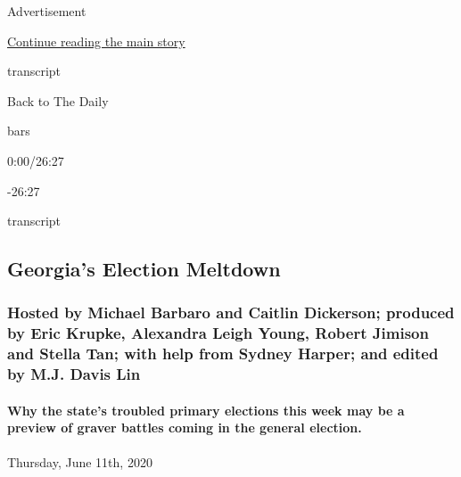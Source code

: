Advertisement

\protect\hyperlink{after-top}{Continue reading the main story}

transcript

Back to The Daily

bars

0:00/26:27

-26:27

transcript

\hypertarget{georgias-election-meltdown}{%
\subsection{Georgia's Election
Meltdown}\label{georgias-election-meltdown}}

\hypertarget{hosted-by-michael-barbaro-and-caitlin-dickerson-produced-by-eric-krupke-alexandra-leigh-young-robert-jimison-and-stella-tan-with-help-from-sydney-harper-and-edited-by-mj-davis-lin}{%
\subsubsection{Hosted by Michael Barbaro and Caitlin Dickerson; produced
by Eric Krupke, Alexandra Leigh Young, Robert Jimison and Stella Tan;
with help from Sydney Harper; and edited by M.J. Davis
Lin}\label{hosted-by-michael-barbaro-and-caitlin-dickerson-produced-by-eric-krupke-alexandra-leigh-young-robert-jimison-and-stella-tan-with-help-from-sydney-harper-and-edited-by-mj-davis-lin}}

\hypertarget{why-the-states-troubled-primary-elections-this-week-may-be-a-preview-of-graver-battles-coming-in-the-general-election}{%
\paragraph{Why the state's troubled primary elections this week may be a
preview of graver battles coming in the general
election.}\label{why-the-states-troubled-primary-elections-this-week-may-be-a-preview-of-graver-battles-coming-in-the-general-election}}

Thursday, June 11th, 2020

